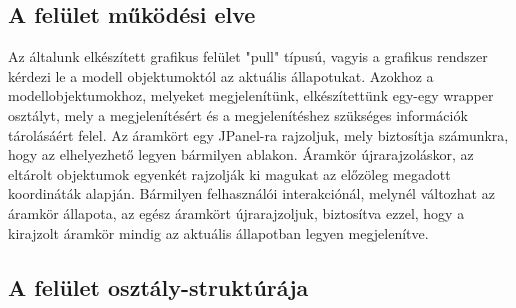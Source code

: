 \subsection{A felület működési elve}

Az általunk elkészített grafikus felület "pull" típusú, vagyis a grafikus rendszer kérdezi le a modell objektumoktól az aktuális állapotukat.
Azokhoz a modellobjektumokhoz, melyeket megjelenítünk, elkészítettünk egy-egy wrapper osztályt, mely a megjelenítésért és a megjelenítéshez szükséges információk tárolásáért felel. 
Az áramkört egy JPanel-ra rajzoljuk, mely biztosítja számunkra, hogy az elhelyezhető legyen bármilyen ablakon. Áramkör újrarajzoláskor, az eltárolt objektumok egyenkét rajzolják ki magukat az előzöleg megadott koordináták alapján.
Bármilyen felhasználói interakciónál, melynél változhat az áramkör állapota, az egész áramkört újrarajzoljuk, biztosítva ezzel, hogy a kirajzolt áramkör mindig az aktuális állapotban legyen megjelenítve.


\subsection{A felület osztály-struktúrája}

